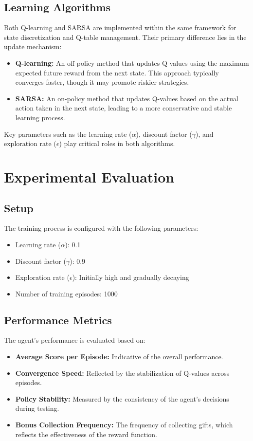 \documentclass[conference]{IEEEtran}
\begin{document}
\subsection{Learning Algorithms}
Both Q-learning and SARSA are implemented within the same framework for state discretization and Q-table management. Their primary difference lies in the update mechanism:
\begin{itemize}
    \item \textbf{Q-learning:} An off-policy method that updates Q-values using the maximum expected future reward from the next state. This approach typically converges faster, though it may promote riskier strategies.
    \item \textbf{SARSA:} An on-policy method that updates Q-values based on the actual action taken in the next state, leading to a more conservative and stable learning process.
\end{itemize}
Key parameters such as the learning rate (\(\alpha\)), discount factor (\(\gamma\)), and exploration rate (\(\epsilon\)) play critical roles in both algorithms.

\section{Experimental Evaluation}
\subsection{Setup}
The training process is configured with the following parameters:
\begin{itemize}
    \item Learning rate (\(\alpha\)): 0.1
    \item Discount factor (\(\gamma\)): 0.9
    \item Exploration rate (\(\epsilon\)): Initially high and gradually decaying
    \item Number of training episodes: 1000
\end{itemize}

\subsection{Performance Metrics}
The agent’s performance is evaluated based on:
\begin{itemize}
    \item \textbf{Average Score per Episode:} Indicative of the overall performance.
    \item \textbf{Convergence Speed:} Reflected by the stabilization of Q-values across episodes.
    \item \textbf{Policy Stability:} Measured by the consistency of the agent's decisions during testing.
    \item \textbf{Bonus Collection Frequency:} The frequency of collecting gifts, which reflects the effectiveness of the reward function.
\end{itemize}
\end{document}
